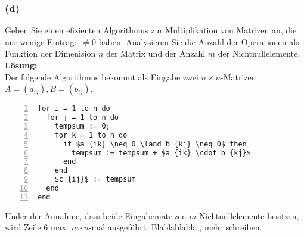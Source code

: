 \documentclass[11pt,a4paper,ngerman]{article}
\begin{document}
\subsubsection*{(d)}

Geben Sie einen efizienten Algorithmus zur Multiplikation von Matrizen an, die nur wenige Einträge $\not= 0$ haben. Analysieren Sie die Anzahl der Operationen
als Funktion der Dimenision $n$ der Matrix und der Anzahl $m$ der Nichtnullelemente.\\

\textbf{Lösung:}\\
Der folgende Algorithmus bekommt als Eingabe zwei $n \times n$-Matrizen $A = (a_{ij}), B = (b_{ij})$.
\begin{lstlisting}[numbers=left]
for i = 1 to n do
  for j = 1 to n do
    tempsum := 0;
    for k = 1 to n do
      if $a_{ik} \neq 0 \land b_{kj} \neq 0$ then
        tempsum := tempsum + $a_{ik} \cdot b_{kj}$
      end
    end
    $c_{ij}$ := tempsum
  end
end
\end{lstlisting}

Under der Annahme, dass beide Eingabematrizen $m$ Nichtnullelemente besitzen, wird Zeile 6 max. $m \cdot n$-mal ausgeführt. Blablablabla,, mehr schreiben.
\label{LastPage}
\end{document}

